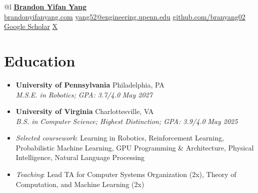 \documentclass[letterpaper,11pt]{article}
\newcommand{\linkhref}[2]{\textcolor{linkblue}{\href{#1}{#2}}}
\newcommand{\Date}[1]{\textit{\small #1}}
\newcommand{\heading}[4]{
  \textbf{#1} \hfill #2 \\
  \textit{\small#3} \hfill \Date{#4}
}
\begin{document}
\begin{tabular} {@{}l}
    \textbf{\href{https://brandonyifanyang.com/}{\Large{Brandon Yifan Yang}}} \\[3pt]
    \linkhref{https://brandonyifanyang.com/}{brandonyifanyang.com} \quad \linkhref{mailto:yang52@engineering.upenn.edu}{yang52@engineering.upenn.edu} \quad \linkhref{https://github.com/branyang02}{github.com/branyang02} \quad \linkhref{https://scholar.google.com/citations?user=dZny9s0AAAAJ&hl=en}{Google Scholar} \quad \linkhref{https://x.com/brandonyyang02}{X}
\end{tabular}


\section{Education}
\begin{itemize}
    \item \heading{University of Pennsylvania}{Philadelphia, PA}{M.S.E. in Robotics; GPA: 3.7/4.0}{May 2027}
    \item \heading{University of Virginia}{Charlottesville, VA}{B.S. in Computer Science; Highest Distinction; GPA: 3.9/4.0}{May 2025}
    \item {\small \textit{Selected coursework}: Learning in Robotics, Reinforcement Learning, Probabilistic Machine Learning, GPU Programming \& Architecture, Physical Intelligence, Natural Language Processing}
    \item {\small \textit{Teaching}: Lead TA for Computer Systems Organization (2x), Theory of Computation, and Machine Learning (2x)}
\end{itemize}
\end{document}

